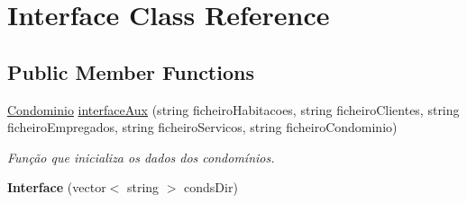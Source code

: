 \hypertarget{class_interface}{}\section{Interface Class Reference}
\label{class_interface}
\subsection*{Public Member Functions}
\begin{DoxyCompactItemize}
\item 
\hyperlink{class_condominio}{Condominio} \hyperlink{class_interface_a616b89df79f6fc646274ae3b8bcf13f1}{interface\+Aux} (string ficheiro\+Habitacoes, string ficheiro\+Clientes, string ficheiro\+Empregados, string ficheiro\+Servicos, string ficheiro\+Condominio)
\begin{DoxyCompactList}\small\item\em Função que inicializa os dados dos condomínios. \end{DoxyCompactList}\item 
{\bfseries Interface} (vector$<$ string $>$ conds\+Dir)\hypertarget{class_interface_ae17d318ea9d763123c3e30be84526862}{}\label{class_interface_ae17d318ea9d763123c3e30be84526862}


\end{DoxyCompactItemize}
